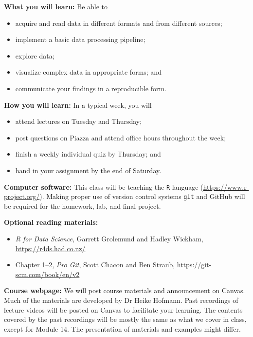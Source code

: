 \documentclass[10pt]{article}
\newcommand{\sep}{\vspace*{0.4cm}}
\begin{document}
\textbf{What you will learn:}
Be able to 
\begin{itemize}
\setlength\itemsep{0pt}
\item acquire and read data in different formats and from different sources;
\item implement a basic data processing pipeline;
\item explore data;
\item visualize complex data in appropriate forms; and 
\item communicate your findings in a reproducible form.
\end{itemize}
\sep

\textbf{How you will learn:}
In a typical week, you will 
\begin{itemize}
\setlength\itemsep{0pt}
\item attend lectures on Tuesday and Thursday;
\item post questions on Piazza and attend office hours throughout the week;
\item finish a weekly individual quiz by Thursday; and
\item hand in your assignment by the end of Saturday. 
\end{itemize}
\sep


\textbf{Computer software:} This class will be teaching the \texttt{R} language (\url{https://www.r-project.org/}). 
Making proper use of version control systems \texttt{git} and GitHub will be required for the homework, lab, and final project. 
\sep

\textbf{Optional reading materials:} 
\begin{itemize}
\setlength\itemsep{0pt}
\item \emph{R for Data Science}, Garrett Grolemund and Hadley Wickham, \url{https://r4ds.had.co.nz/}
\item Chapter 1--2, \emph{Pro Git}, Scott Chacon and Ben Straub, \url{https://git-scm.com/book/en/v2}
\end{itemize}
\sep

\textbf{Course webpage:} We will post course materials and announcement on Canvas. 
Much of the materials are developed by Dr Heike Hofmann. 
Past recordings of lecture videos will be posted on Canvas to facilitate your learning.
The contents covered by the past recordings will be mostly the same as what we cover in class, except for Module 14.
The presentation of materials and examples might differ.
\sep
\end{document}
